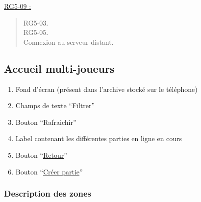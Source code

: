 \documentclass{report}
\begin{document}
			$\,$

			\underline{RG5-09 :}
				\begin{quote}
					RG5-03.\\
					RG5-05.\\
					Connexion au serveur distant.			
				\end{quote}


\newpage

	\subsection{Accueil multi-joueurs}

		\hypertarget{Accueil multi-joueurs}{}
		\label{Accueil multi-joueurs}

		\begin{center}
			
		\end{center}

		\begin{enumerate}
		  \item Fond d'écran (présent dans l'archive stocké sur le téléphone)
		  \item Champs de texte ``Filtrer''
		  \item Bouton ``Rafraichir''
		  \item Label contenant les différentes parties en ligne en cours
		  \item Bouton ``\hyperlink{Accueil}{Retour}''
		  \item Bouton ``\hyperlink{Creer partie multi-joueurs}{Créer partie}''
		\end{enumerate}

		\subsubsection{Description des zones}
\end{document}

